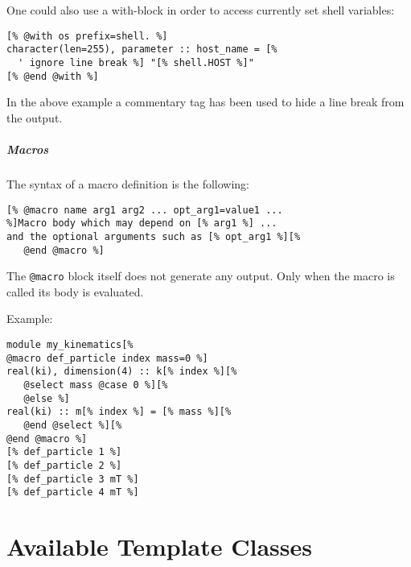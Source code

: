 \documentclass[11pt,a4paper]{refrep}
\begin{document}
One could also use a with-block in order to access currently set
shell variables:
\begin{lstlisting}
[% @with os prefix=shell. %]
character(len=255), parameter :: host_name = [%
  ' ignore line break %] "[% shell.HOST %]"
[% @end @with %]
\end{lstlisting}
In the above example a commentary tag has been used to hide a
line break from the output.

\paragraph{Macros}
The syntax of a macro definition is the following:
\begin{lstlisting}[language=gosamt]
[% @macro name arg1 arg2 ... opt_arg1=value1 ...
%]Macro body which may depend on [% arg1 %] ...
and the optional arguments such as [% opt_arg1 %][%
   @end @macro %]
\end{lstlisting}

\attention{} The \texttt{@macro} block itself does not generate
any output. Only when the macro is called its body is evaluated.

Example:
\begin{lstlisting}
module my_kinematics[%
@macro def_particle index mass=0 %]
real(ki), dimension(4) :: k[% index %][%
   @select mass @case 0 %][%
   @else %]
real(ki) :: m[% index %] = [% mass %][%
   @end @select %][%
@end @macro %]
[% def_particle 1 %]
[% def_particle 2 %]
[% def_particle 3 mT %]
[% def_particle 4 mT %]
\end{lstlisting}

\appendix
\chapter{Available Template Classes}
\label{appendix:template-classes}
\end{document}
